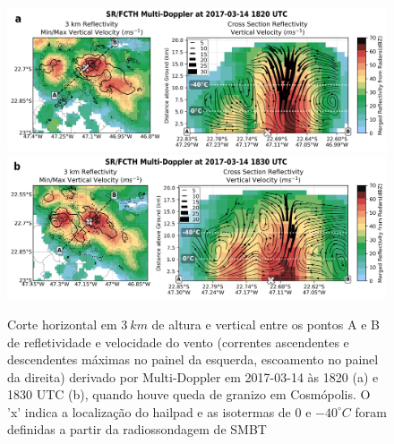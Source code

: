 \begin{figure}[htb]
	\centering
	\caption{Corte horizontal em $3\:km$ de altura e vertical entre os pontos A e B de refletividade e velocidade do vento (correntes ascendentes e descendentes máximas no painel da esquerda, escoamento no painel da direita) derivado por Multi-Doppler em 2017-03-14 às 1820 (a) e 1830 UTC (b), quando houve queda de granizo em Cosmópolis. O 'x' indica a localização do hailpad e as isotermas de $0$ e $-40^{\circ}C$ foram definidas a partir da radiossondagem de SMBT} 
	\label{doppler_20170314_1}
	\vspace{-5pt}
	\includegraphics[width=\columnwidth]{../MultiDoppler_Processing/figures/SR-FCTH 2017-03-14 1820 UTC.png}
		\label{dopplera_20170314_1} \\
	\vspace{-15pt}
	\includegraphics[width=\columnwidth]{../MultiDoppler_Processing/figures/SR-FCTH 2017-03-14 1830 UTC.png}
		\label{dopplerb_20170314_1} \\
	\vspace{-5pt}
\end{figure}

